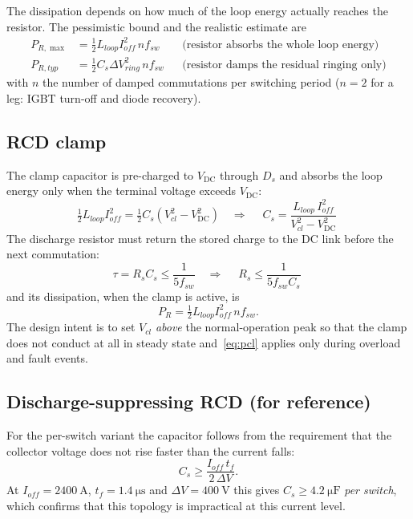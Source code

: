 \documentclass[11pt,a4paper]{article}
\newcommand{\Vdc}{V_{\mathrm{DC}}}
\begin{document}
The dissipation depends on how much of the loop energy actually reaches the
resistor. The pessimistic bound and the realistic estimate are
\begin{align}
P_{R,\max} &= \tfrac{1}{2}L_{loop} I_{off}^{2}\, n f_{sw} && \text{(resistor absorbs the whole loop energy)} \label{eq:prmax}\\
P_{R,typ}  &= \tfrac{1}{2}C_s \Delta V_{ring}^{2}\, n f_{sw} && \text{(resistor damps the residual ringing only)} \label{eq:prtyp}
\end{align}
with $n$ the number of damped commutations per switching period ($n=2$ for a
leg: IGBT turn-off and diode recovery).

\subsection{RCD clamp}

The clamp capacitor is pre-charged to $\Vdc$ through $D_s$ and absorbs the
loop energy only when the terminal voltage exceeds $\Vdc$:
\begin{equation}
\tfrac{1}{2}L_{loop} I_{off}^{2}
= \tfrac{1}{2}C_s\left(V_{cl}^{2}-\Vdc^{2}\right)
\quad\Longrightarrow\quad
\boxed{\;C_s = \frac{L_{loop}\,I_{off}^{2}}{V_{cl}^{2}-\Vdc^{2}}\;}
\label{eq:ccl}
\end{equation}
The discharge resistor must return the stored charge to the DC link before the
next commutation:
\begin{equation}
\tau = R_s C_s \le \frac{1}{5 f_{sw}}
\quad\Longrightarrow\quad
\boxed{\;R_s \le \frac{1}{5 f_{sw} C_s}\;}
\label{eq:rcl}
\end{equation}
and its dissipation, when the clamp is active, is
\begin{equation}
P_{R} = \tfrac{1}{2}L_{loop}I_{off}^{2}\,n f_{sw}.
\label{eq:pcl}
\end{equation}
The design intent is to set $V_{cl}$ \emph{above} the normal-operation peak so
that the clamp does not conduct at all in steady state and~\eqref{eq:pcl}
applies only during overload and fault events.

\subsection{Discharge-suppressing RCD (for reference)}

For the per-switch variant the capacitor follows from the requirement that the
collector voltage does not rise faster than the current falls:
\begin{equation}
C_s \ge \frac{I_{off}\,t_f}{2\,\Delta V}.
\end{equation}
At $I_{off}=\SI{2400}{\ampere}$, $t_f=\SI{1.4}{\micro\second}$ and
$\Delta V = \SI{400}{\volt}$ this gives $C_s \ge \SI{4.2}{\micro\farad}$
\emph{per switch}, which confirms that this topology is impractical at this
current level.
\end{document}
